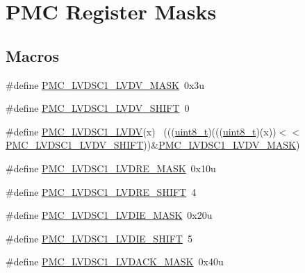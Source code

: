 \hypertarget{group___p_m_c___register___masks}{}\section{P\+MC Register Masks}
\label{group___p_m_c___register___masks}
\subsection*{Macros}
\begin{DoxyCompactItemize}
\item 
\#define \hyperlink{group___p_m_c___register___masks_ga777eada2a526d88569a30323e9d3e1d3}{P\+M\+C\+\_\+\+L\+V\+D\+S\+C1\+\_\+\+L\+V\+D\+V\+\_\+\+M\+A\+SK}~0x3u
\item 
\#define \hyperlink{group___p_m_c___register___masks_gaaf45daa6de387f93bc57f1218ab17a16}{P\+M\+C\+\_\+\+L\+V\+D\+S\+C1\+\_\+\+L\+V\+D\+V\+\_\+\+S\+H\+I\+FT}~0
\item 
\#define \hyperlink{group___p_m_c___register___masks_gaa14e8452bdb4c61c57ed23eda94f715a}{P\+M\+C\+\_\+\+L\+V\+D\+S\+C1\+\_\+\+L\+V\+DV}(x)                                          ~(((\hyperlink{_p_e___types_8h_aba7bc1797add20fe3efdf37ced1182c5}{uint8\+\_\+t})(((\hyperlink{_p_e___types_8h_aba7bc1797add20fe3efdf37ced1182c5}{uint8\+\_\+t})(x))$<$$<$\hyperlink{group___p_m_c___register___masks_gaaf45daa6de387f93bc57f1218ab17a16}{P\+M\+C\+\_\+\+L\+V\+D\+S\+C1\+\_\+\+L\+V\+D\+V\+\_\+\+S\+H\+I\+FT}))\&\hyperlink{group___p_m_c___register___masks_ga777eada2a526d88569a30323e9d3e1d3}{P\+M\+C\+\_\+\+L\+V\+D\+S\+C1\+\_\+\+L\+V\+D\+V\+\_\+\+M\+A\+SK})
\item 
\#define \hyperlink{group___p_m_c___register___masks_gad771f87e373907e3ef60e5fa31001fad}{P\+M\+C\+\_\+\+L\+V\+D\+S\+C1\+\_\+\+L\+V\+D\+R\+E\+\_\+\+M\+A\+SK}~0x10u
\item 
\#define \hyperlink{group___p_m_c___register___masks_ga056ca878a20782f5bf65b3be3e98581d}{P\+M\+C\+\_\+\+L\+V\+D\+S\+C1\+\_\+\+L\+V\+D\+R\+E\+\_\+\+S\+H\+I\+FT}~4
\item 
\#define \hyperlink{group___p_m_c___register___masks_ga1e7518c88ea0037d099124a643788363}{P\+M\+C\+\_\+\+L\+V\+D\+S\+C1\+\_\+\+L\+V\+D\+I\+E\+\_\+\+M\+A\+SK}~0x20u
\item 
\#define \hyperlink{group___p_m_c___register___masks_ga30ca240c9254a7e76123a3cf2bfdc40e}{P\+M\+C\+\_\+\+L\+V\+D\+S\+C1\+\_\+\+L\+V\+D\+I\+E\+\_\+\+S\+H\+I\+FT}~5
\item 
\#define \hyperlink{group___p_m_c___register___masks_ga65d04677ca16ad916563d6673cb8ecaa}{P\+M\+C\+\_\+\+L\+V\+D\+S\+C1\+\_\+\+L\+V\+D\+A\+C\+K\+\_\+\+M\+A\+SK}~0x40u
$$
\end{DoxyCompactItemize}
